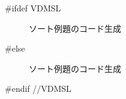 \documentclass[\pformat,12pt]{jarticle}
\begin{document}
#ifdef VDMSL
\begin{figure}[tbh]
\begin{center}
\mbox{}
\caption{ソート例題のコード生成}\label{fig:cg}
\end{center}
\end{figure}
#else
\begin{figure}[tbh]
\begin{center}
\mbox{}
\caption{ソート例題のコード生成}\label{fig:cg}
\end{center}
\end{figure}
#endif //VDMSL
\end{document}
